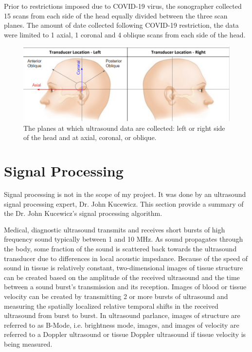 \documentclass [11pt, proquest] {uwthesis}[2020/02/24]
\begin{document}
Prior to restrictions imposed due to COVID-19 virus, the sonographer collected 15 scans from each side of the head equally divided between
the three scan planes. The amount of date collected following COVID-19 restriction, the data were limited to 1 axial, 1 coronal and 4 oblique
scans from each side of the head.

\begin{figure}
  \centering
  \includegraphics[width=1\linewidth]{figures/ultrasound_angle.png}
  \caption{The planes at which ultrasound data are collected: left or right side of the head and at axial, coronal, or oblique.}
  \label{ultrasound_angle}
\end{figure}

\section{Signal Processing}

Signal processing is not in the scope of my project. It was done by an ultrasound signal processing expert, Dr. John Kucewicz.
This section provide a summary of the Dr. John Kucewicz's signal processing algorithm.

Medical, diagnostic ultrasound transmits and receives short bursts of high frequency sound typically between 1 and 10 MHz. 
As sound propagates through the body, some fraction of the sound is scattered back towards the ultrasound transducer due 
to differences in local acoustic impedance.  Because of the speed of sound in tissue is relatively constant, two-dimensional 
images of tissue structure can be created based on the amplitude of the received ultrasound and the time between a sound 
burst’s transmission and its reception.  Images of blood or tissue velocity can be created by transmitting 2 or more bursts 
of ultrasound and measuring the spatially localized relative temporal shifts in the received ultrasound from burst to burst.  
In ultrasound parlance, images of structure are referred to as B-Mode, i.e. brightness mode, images, and images of velocity are 
referred to a Doppler ultrasound or tissue Doppler ultrasound if tissue velocity is being measured.
\end{document}
